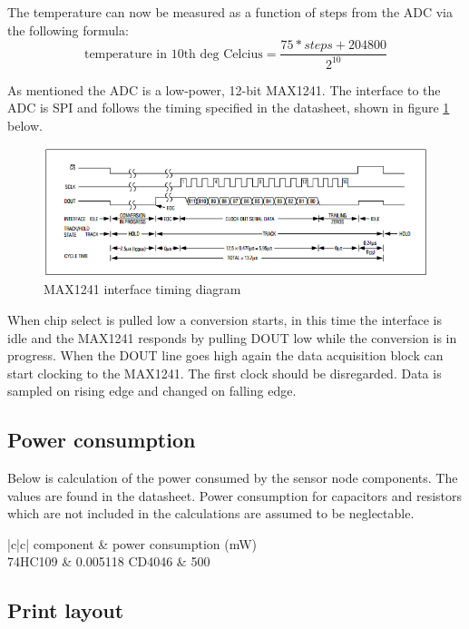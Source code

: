 The temperature can now be measured as a function of steps from the ADC via the following formula:
\begin{equation}
	\text{temperature in 10th deg Celcius} = \frac{75*steps+204800}{2^{10}}
\end{equation}

As mentioned the ADC is a low-power, 12-bit MAX1241. The interface to the ADC is SPI and follows the timing specified in the datasheet, shown in figure \ref{fig:max1241_timing} below.


\begin{figure}[H]
	\centering
	\includegraphics[width=1\textwidth]{billeder/max1241_interface_timing}
	\caption{MAX1241 interface timing diagram}
	\label{fig:max1241_timing}
\end{figure}

When chip select is pulled low a conversion starts, in this time the interface is idle and the MAX1241 responds by pulling DOUT low while the conversion is in progress. When the DOUT line goes high again the data acquisition block can start clocking to the MAX1241. The first clock should be disregarded. Data is sampled on rising edge and changed on falling edge.

\subsection{Power consumption}
Below is calculation of the power consumed by the sensor node components. The values are found in the datasheet. Power consumption for capacitors and resistors which are not included in the calculations are assumed to be neglectable.

\begin{table}[H]
	\centering
	\begin{tabular}{|c|c|}
		\hline
		component 	&	power consumption (mW)\\ \hline
		74HC109 	&	0.005118
		CD4046		&	500 \\ \hline
		
	\end{tabular}
\end{table}


\subsection{Print layout}






